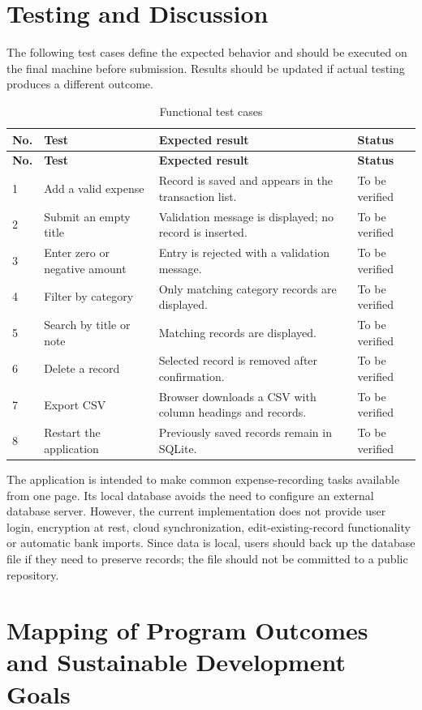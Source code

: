 \documentclass[11pt,a4paper]{report}
\begin{document}
\section{Testing and Discussion}
The following test cases define the expected behavior and should be executed on the final machine before submission. Results should be updated if actual testing produces a different outcome.
\begin{longtable}{|p{0.7cm}|p{4.2cm}|p{4.3cm}|p{3.1cm}|}
\caption{Functional test cases}\\\hline
\textbf{No.} & \textbf{Test} & \textbf{Expected result} & \textbf{Status}\\\hline
\endfirsthead
\hline \textbf{No.} & \textbf{Test} & \textbf{Expected result} & \textbf{Status}\\\hline
\endhead
1 & Add a valid expense & Record is saved and appears in the transaction list. & To be verified\\\hline
2 & Submit an empty title & Validation message is displayed; no record is inserted. & To be verified\\\hline
3 & Enter zero or negative amount & Entry is rejected with a validation message. & To be verified\\\hline
4 & Filter by category & Only matching category records are displayed. & To be verified\\\hline
5 & Search by title or note & Matching records are displayed. & To be verified\\\hline
6 & Delete a record & Selected record is removed after confirmation. & To be verified\\\hline
7 & Export CSV & Browser downloads a CSV with column headings and records. & To be verified\\\hline
8 & Restart the application & Previously saved records remain in SQLite. & To be verified\\\hline
\end{longtable}

The application is intended to make common expense-recording tasks available from one page. Its local database avoids the need to configure an external database server. However, the current implementation does not provide user login, encryption at rest, cloud synchronization, edit-existing-record functionality or automatic bank imports. Since data is local, users should back up the database file if they need to preserve records; the file should not be committed to a public repository.

\section{Mapping of Program Outcomes and Sustainable Development Goals}
\end{document}
